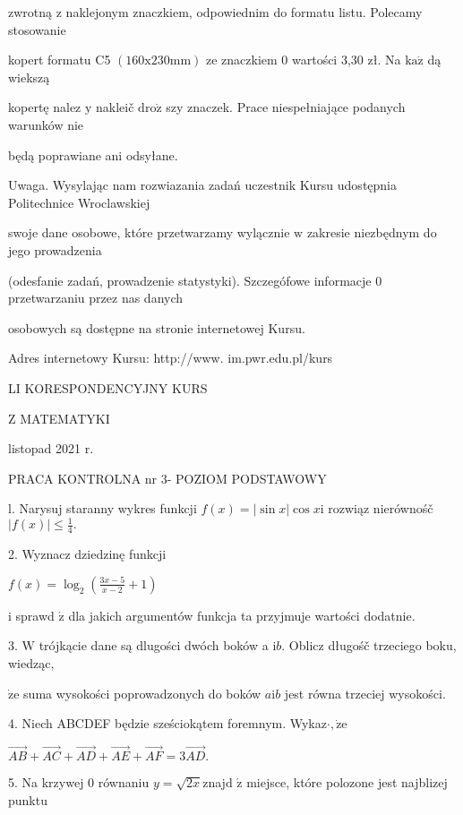 \documentclass[a4paper,12pt]{article}
\begin{document}
zwrotną $\mathrm{z}$ naklejonym znaczkiem, odpowiednim do formatu listu. Polecamy stosowanie

kopert formatu C5 $(160\mathrm{x}230\mathrm{m}\mathrm{m})$ ze znaczkiem $0$ wartości 3,30 zł. Na $\mathrm{k}\mathrm{a}\dot{\mathrm{z}}$ dą wiekszą

kopertę nalez $\mathrm{y}$ nakleič $\mathrm{d}\mathrm{r}\mathrm{o}\dot{\mathrm{z}}$ szy znaczek. Prace niespełniające podanych warunków nie

będą poprawiane ani odsyłane.

Uwaga. Wysylając nam rozwiazania zadań uczestnik Kursu udostępnia Politechnice Wroclawskiej

swoje dane osobowe, które przetwarzamy wylącznie $\mathrm{w}$ zakresie niezbędnym do jego prowadzenia

(odesfanie zadań, prowadzenie statystyki). Szczegófowe informacje $0$ przetwarzaniu przez nas danych

osobowych są dostępne na stronie internetowej Kursu.

Adres internetowy Kursu: http://www. im.pwr.edu.pl/kurs







LI KORESPONDENCYJNY KURS

Z MATEMATYKI

listopad 2021 r.

PRACA KONTROLNA nr $3$- POZIOM PODSTAWOWY

l. Narysuj staranny wykres funkcji $f(x)=|\sin x|\cos x\mathrm{i}$ rozwiąz nierównośč $|f(x)|\displaystyle \leq\frac{1}{4}.$

2. Wyznacz dziedzinę funkcji

$f(x)=\displaystyle \log_{2}(\frac{3x-5}{x-2}+1)$

$\mathrm{i}$ sprawd $\acute{\mathrm{z}}$ dla jakich argumentów funkcja ta przyjmuje wartości dodatnie.

3. $\mathrm{W}$ trójkącie dane są dlugości dwóch boków a $\mathrm{i}b$. Oblicz długośč trzeciego boku, wiedząc,

$\dot{\mathrm{z}}\mathrm{e}$ suma wysokości poprowadzonych do boków $a\mathrm{i}b$ jest równa trzeciej wysokości.

4. Niech ABCDEF będzie sześciokątem foremnym. Wykaz$\cdot, \dot{\mathrm{z}}\mathrm{e}$

$\vec{AB}+\vec{AC}+\vec{AD}+\vec{AE}+\vec{AF}=3\vec{AD}.$

5. Na krzywej $0$ równaniu $y= \sqrt{2x}$znajd $\acute{\mathrm{z}}$ miejsce, które polozone jest najblizej punktu
\end{document}
